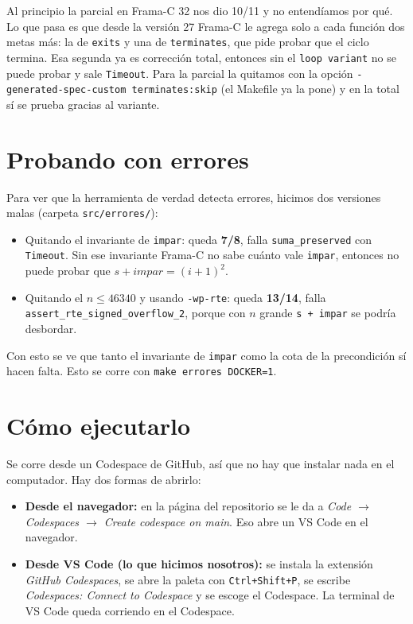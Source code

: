 \documentclass[11pt,letterpaper]{article}
\begin{document}
Al principio la parcial en Frama-C 32 nos dio 10/11 y no entendíamos por qué. Lo que pasa es que desde la versión 27 Frama-C le agrega solo a cada función dos metas más: la de \texttt{exits} y una de \texttt{terminates}, que pide probar que el ciclo termina. Esa segunda ya es corrección total, entonces sin el \texttt{loop variant} no se puede probar y sale \texttt{Timeout}. Para la parcial la quitamos con la opción \texttt{-generated-spec-custom terminates:skip} (el Makefile ya la pone) y en la total sí se prueba gracias al variante.

\section{Probando con errores}

Para ver que la herramienta de verdad detecta errores, hicimos dos versiones malas (carpeta \texttt{src/errores/}):
\begin{itemize}
\item Quitando el invariante de \texttt{impar}: queda \textbf{7/8}, falla \texttt{suma\_preserved} con \texttt{Timeout}. Sin ese invariante Frama-C no sabe cuánto vale \texttt{impar}, entonces no puede probar que $s + \mathit{impar} = (i+1)^2$.
\item Quitando el $n \le 46340$ y usando \texttt{-wp-rte}: queda \textbf{13/14}, falla \texttt{assert\_rte\_signed\_overflow\_2}, porque con $n$ grande \texttt{s + impar} se podría desbordar.
\end{itemize}
Con esto se ve que tanto el invariante de \texttt{impar} como la cota de la precondición sí hacen falta. Esto se corre con \texttt{make errores DOCKER=1}.

\section{Cómo ejecutarlo}

Se corre desde un Codespace de GitHub, así que no hay que instalar nada en el computador. Hay dos formas de abrirlo:

\begin{itemize}
\item \textbf{Desde el navegador:} en la página del repositorio se le da a \textit{Code $\to$ Codespaces $\to$ Create codespace on main}. Eso abre un VS Code en el navegador.
\item \textbf{Desde VS Code (lo que hicimos nosotros):} se instala la extensión \textit{GitHub Codespaces}, se abre la paleta con \texttt{Ctrl+Shift+P}, se escribe \textit{Codespaces: Connect to Codespace} y se escoge el Codespace. La terminal de VS Code queda corriendo en el Codespace.
\end{itemize}
\end{document}
